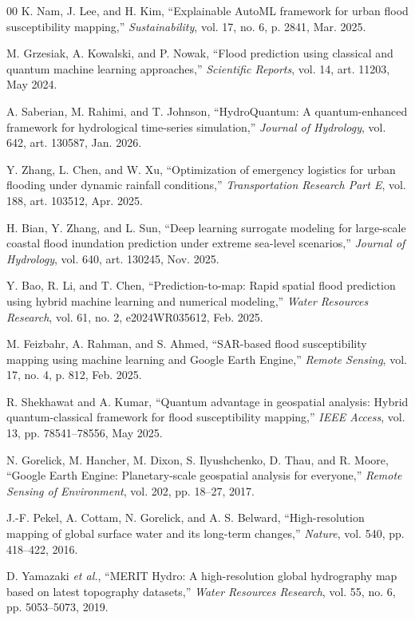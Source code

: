 \documentclass[conference]{IEEEtran}
\begin{document}
\begin{thebibliography}{00}
 K. Nam, J. Lee, and H. Kim, ``Explainable AutoML framework for urban flood susceptibility mapping,'' \emph{Sustainability}, vol. 17, no. 6, p. 2841, Mar. 2025.

 M. Grzesiak, A. Kowalski, and P. Nowak, ``Flood prediction using classical and quantum machine learning approaches,'' \emph{Scientific Reports}, vol. 14, art. 11203, May 2024.

 A. Saberian, M. Rahimi, and T. Johnson, ``HydroQuantum: A quantum-enhanced framework for hydrological time-series simulation,'' \emph{Journal of Hydrology}, vol. 642, art. 130587, Jan. 2026.

 Y. Zhang, L. Chen, and W. Xu, ``Optimization of emergency logistics for urban flooding under dynamic rainfall conditions,'' \emph{Transportation Research Part E}, vol. 188, art. 103512, Apr. 2025.

 H. Bian, Y. Zhang, and L. Sun, ``Deep learning surrogate modeling for large-scale coastal flood inundation prediction under extreme sea-level scenarios,'' \emph{Journal of Hydrology}, vol. 640, art. 130245, Nov. 2025.

 Y. Bao, R. Li, and T. Chen, ``Prediction-to-map: Rapid spatial flood prediction using hybrid machine learning and numerical modeling,'' \emph{Water Resources Research}, vol. 61, no. 2, e2024WR035612, Feb. 2025.

 M. Feizbahr, A. Rahman, and S. Ahmed, ``SAR-based flood susceptibility mapping using machine learning and Google Earth Engine,'' \emph{Remote Sensing}, vol. 17, no. 4, p. 812, Feb. 2025.

 R. Shekhawat and A. Kumar, ``Quantum advantage in geospatial analysis: Hybrid quantum-classical framework for flood susceptibility mapping,'' \emph{IEEE Access}, vol. 13, pp. 78541--78556, May 2025.

 N. Gorelick, M. Hancher, M. Dixon, S. Ilyushchenko, D. Thau, and R. Moore, ``Google Earth Engine: Planetary-scale geospatial analysis for everyone,'' \emph{Remote Sensing of Environment}, vol. 202, pp. 18--27, 2017.

 J.-F. Pekel, A. Cottam, N. Gorelick, and A. S. Belward, ``High-resolution mapping of global surface water and its long-term changes,'' \emph{Nature}, vol. 540, pp. 418--422, 2016.

 D. Yamazaki \emph{et al.}, ``MERIT Hydro: A high-resolution global hydrography map based on latest topography datasets,'' \emph{Water Resources Research}, vol. 55, no. 6, pp. 5053--5073, 2019.


\end{thebibliography}
\end{document}
